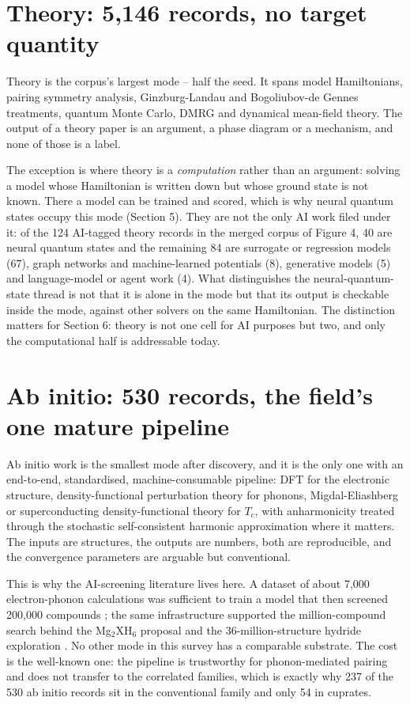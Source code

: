 \documentclass[
  11pt,
]{article}
\newcounter{none} %
\begin{document}
\section{Theory: 5,146 records, no target
quantity}\label{theory-5146-records-no-target-quantity}

Theory is the corpus's largest mode -- half the seed. It spans model
Hamiltonians, pairing symmetry analysis, Ginzburg-Landau and
Bogoliubov-de Gennes treatments, quantum Monte Carlo, DMRG and dynamical
mean-field theory. The output of a theory paper is an argument, a phase
diagram or a mechanism, and none of those is a label.

The exception is where theory is a \emph{computation} rather than an
argument: solving a model whose Hamiltonian is written down but whose
ground state is not known. There a model can be trained and scored,
which is why neural quantum states occupy this mode (Section 5). They
are not the only AI work filed under it: of the 124 AI-tagged theory
records in the merged corpus of Figure 4, 40 are neural quantum states
and the remaining 84 are surrogate or regression models (67), graph
networks and machine-learned potentials (8), generative models (5) and
language-model or agent work (4). What distinguishes the
neural-quantum-state thread is not that it is alone in the mode but that
its output is checkable inside the mode, against other solvers on the
same Hamiltonian. The distinction matters for Section 6: theory is not
one cell for AI purposes but two, and only the computational half is
addressable today.

\section{Ab initio: 530 records, the field's one mature
pipeline}\label{ab-initio-530-records-the-fields-one-mature-pipeline}

Ab initio work is the smallest mode after discovery, and it is the only
one with an end-to-end, standardised, machine-consumable pipeline: DFT
for the electronic structure, density-functional perturbation theory for
phonons, Migdal-Eliashberg or superconducting density-functional theory
for \(T_c\), with anharmonicity treated through the stochastic
self-consistent harmonic approximation where it matters. The inputs are
structures, the outputs are numbers, both are reproducible, and the
convergence parameters are arguable but conventional.

This is why the AI-screening literature lives here. A dataset of about
7,000 electron-phonon calculations was sufficient to train a model that
then screened 200,000 compounds \citep{cerqueira2023sampling}; the same
infrastructure supported the million-compound search behind the
Mg\(_2\)XH\(_6\) proposal \citep{sanna2023prediction} and the
36-million-structure hydride exploration \citep{wang2025discoverya}. No
other mode in this survey has a comparable substrate. The cost is the
well-known one: the pipeline is trustworthy for phonon-mediated pairing
and does not transfer to the correlated families, which is exactly why
237 of the 530 ab initio records sit in the conventional family and only
54 in cuprates.
\end{document}
